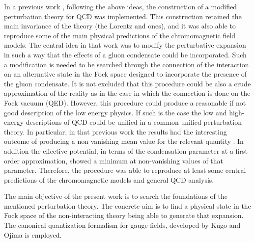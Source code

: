 \documentclass[12pt,letterpaper]{report}
\begin{document}
In a previous work \cite{Cabo}, following the above ideas, the
construction of a modified perturbation theory for QCD was
implemented. This construction retained the main invariance of the
theory (the Lorentz and \coordHE{} ones), and it was also able to
reproduce some of the main physical predictions of the
chromomagnetic field models. The central idea in that work was to
modify the perturbative expansion in such a way that the effects
of a gluon condensate could be incorporated. Such a modification
is needed to be searched through the connection of the interaction
on an alternative state in the Fock space designed to incorporate
the presence of the gluon condensate. It is not excluded that this
procedure could be also a crude approximation of the reality as in
the case in which the connection is done on the Fock vacuum (QED).
However, this procedure could produce a reasonable if not good
description of the low energy physics. If such is the case the low
and high-energy descriptions of QCD could be unified in a common
unified perturbation theory. In particular, in that previous work
\cite{Cabo} the results had the interesting outcome of producing a
non vanishing mean value for the relevant quantity \coordHE{}. In
addition the effective potential, in terms of the condensation
parameter at a first order approximation, showed a minimum at
non-vanishing values of that parameter. Therefore, the procedure
was able to reproduce at least some central predictions of the
chromomagnetic models and general QCD analysis.

The main objective of the present work is to search the
foundations of the mentioned perturbation theory. The concrete aim
is to find a physical state in the Fock space of the
non-interacting theory being able to generate that expansion. The
canonical quantization formalism for gauge fields, developed by
Kugo and Ojima is employed.
\end{document}
